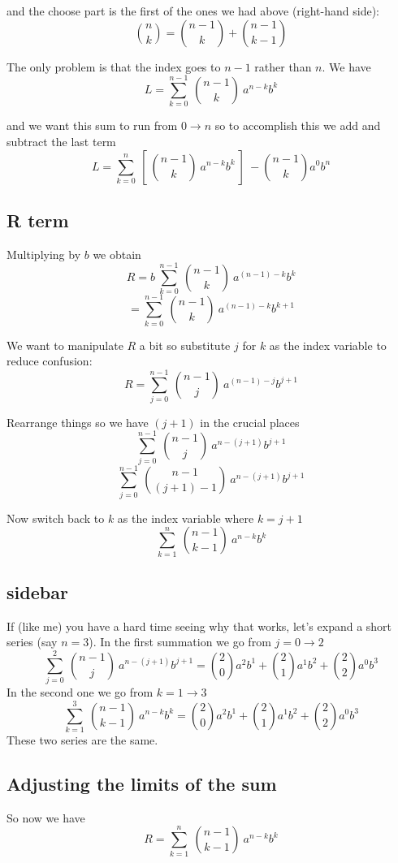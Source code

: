 \documentclass[11pt, oneside]{article}   	%
\begin{document}
and the choose part is the first of the ones we had above (right-hand side):
\[  {{n}\choose{k}} = {{n-1}\choose{k}} + {{n-1}\choose{k-1}} \]

The only problem is that the index goes to $n-1$ rather than $n$.  We have
\[ L = \sum_{k=0}^{n-1} \ {n-1 \choose k} \ a^{n-k}b^k \]

and we want this sum to run from $0 \to n$ so to accomplish this we add and subtract the last term
\[ L = \sum_{k=0}^{n}  \ [ \  {n-1 \choose k} \ a^{n-k}b^k  \ ] \  - {n-1 \choose k}a^0b^n \]

\subsection*{R term}
Multiplying by $b$ we obtain
\[ R = b \ \sum_{k=0}^{n-1} \ {n-1 \choose k} \ a^{(n-1)-k}b^k \]
\[ = \sum_{k=0}^{n-1} \ {n-1 \choose k} \ a^{(n-1)-k}b^{k+1} \]

We want to manipulate $R$ a bit so substitute $j$ for $k$ as the index variable to reduce confusion:
\[ R = \sum_{j=0}^{n-1} \ {n-1 \choose j} \ a^{(n-1)-j}b^{j+1} \]

Rearrange things so we have $(j+1)$ in the crucial places
\[ \sum_{j=0}^{n-1} \ {n-1 \choose j} \ a^{n-(j+1)}b^{j+1} \]
\[ \sum_{j=0}^{n-1} \ {n-1 \choose (j+1)-1} \ a^{n-(j+1)}b^{j+1} \]

Now switch back to $k$ as the index variable where $k=j+1$
\[ \sum_{k=1}^{n} \ {n-1 \choose k-1} \ a^{n-k}b^{k} \]

\subsection*{sidebar}

If (like me) you have a hard time seeing why that works, let's expand a short series (say $n=3$).  In the first summation we go from $j=0 \to 2$
\[ \sum_{j=0}^{2} \ {n-1 \choose j} \ a^{n-(j+1)}b^{j+1} = {2 \choose 0}a^2b^1 + {2 \choose 1}a^1b^2 + {2 \choose 2}a^0b^3\]
In the second one we go from $k=1 \to 3$
\[ \sum_{k=1}^{3} \ {n-1 \choose k-1} \ a^{n-k}b^k = {2 \choose 0}a^2b^1 + {2 \choose 1}a^1b^2 + {2 \choose 2}a^0b^3\]
These two series are the same.

\subsection*{Adjusting the limits of the sum}

So now we have
\[ R = \sum_{k=1}^{n} \ {n-1 \choose k-1} \ a^{n-k}b^{k} \]
\end{document}
